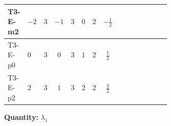 \documentclass[8pt]{article}
\begin{document}
\begin{landscape}
\begin{longtable}{@{}llcccccc >{\raggedright\arraybackslash}p{0.21\linewidth} >{\raggedright\arraybackslash}p{0.21\linewidth} >{\raggedright\arraybackslash}p{0.21\linewidth}@{}}
\midrule
T3-E-m2 & $-2$ & $3$ & $-1$ & $3$ & $0$ & $2$ & $-\frac{1}{2}$ & \scriptsize\adjustbox{max width=\linewidth}{$\begin{gathered} -12 \operatorname{Tr}\!\left({Y_u}\,\left({Y_u}\right)^{\dagger}\,{Y_u}\,\left({Y_u}\right)^{\dagger}\right)\end{gathered}$} & \scriptsize\adjustbox{max width=\linewidth}{$\begin{gathered} +4 {\lambda_5} \left({\lambda_5}\right)^{*}\end{gathered}$} & \scriptsize\adjustbox{max width=\linewidth}{$\begin{gathered} +\frac{9 {g_2}^4}{4}\end{gathered}$} \\
\midrule
T3-E-p0 & $0$ & $3$ & $0$ & $3$ & $1$ & $2$ & $\frac{1}{2}$ & \scriptsize\adjustbox{max width=\linewidth}{$\begin{gathered} -12 \operatorname{Tr}\!\left({Y_u}\,\left({Y_u}\right)^{\dagger}\,{Y_u}\,\left({Y_u}\right)^{\dagger}\right)\end{gathered}$} & \scriptsize\adjustbox{max width=\linewidth}{$\begin{gathered} +4 {\lambda_5} \left({\lambda_5}\right)^{*}\end{gathered}$} & \scriptsize\adjustbox{max width=\linewidth}{$\begin{gathered} +\frac{9 {g_2}^4}{4}\end{gathered}$} \\
\midrule
T3-E-p2 & $2$ & $3$ & $1$ & $3$ & $2$ & $2$ & $\frac{3}{2}$ & \scriptsize\adjustbox{max width=\linewidth}{$\begin{gathered} -12 \operatorname{Tr}\!\left({Y_u}\,\left({Y_u}\right)^{\dagger}\,{Y_u}\,\left({Y_u}\right)^{\dagger}\right)\end{gathered}$} & \scriptsize\adjustbox{max width=\linewidth}{$\begin{gathered} +4 {\lambda_5} \left({\lambda_5}\right)^{*}\end{gathered}$} & \scriptsize\adjustbox{max width=\linewidth}{$\begin{gathered} +\frac{9 {g_2}^4}{4}\end{gathered}$} \\
\midrule
\bottomrule
\end{longtable}
\clearpage
\noindent\textbf{Quantity: }$\lambda_1$\par\smallskip

\end{landscape}
\end{document}

